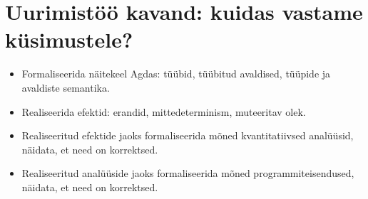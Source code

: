 \documentclass[a4paper]{article}
\begin{document}
\section{Uurimistöö kavand: kuidas vastame küsimustele?}

\begin{itemize}
\item Formaliseerida näitekeel Agdas: tüübid, tüübitud avaldised, tüüpide ja avaldiste semantika.
\item Realiseerida efektid: erandid, mittedeterminism, muteeritav olek.
\item Realiseeritud efektide jaoks formaliseerida mõned kvantitatiivsed analüüsid, näidata, et need on korrektsed.
\item Realiseeritud analüüside jaoks formaliseerida mõned programmiteisendused, näidata, et need on korrektsed.
\end{itemize}
\end{document}
